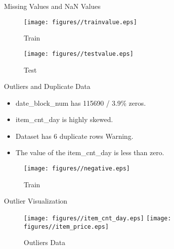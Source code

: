 \documentclass[
 size=14pt,
 paper=smartboard,  %
 mode=present, 		%
 display=slides, 	%
 style=tuliplab,  	%
 pauseslide,
 fleqn,leqno]{powerdot}
\begin{document}
\begin{slide}{Missing Values and NaN Values}

\begin{figure}
  \centering
  \texttt{[image: figures//trainvalue.eps]}
  \caption{Train}\label{fig:demical}
\end{figure}

\begin{figure}
  \centering
  \texttt{[image: figures//testvalue.eps]}
  \caption{Test}\label{fig:timg}
\end{figure}

\end{slide}


\begin{slide}{Outliers and Duplicate Data}

\begin{itemize}
\item
date\_block\_num has 115690 / 3.9\% zeros.
\item
item\_cnt\_day is highly skewed.
\item
Dataset has 6 duplicate rows Warning.
\item
The value of the item\_cnt\_day is less than zero.
\end{itemize}
\begin{figure}
	\centering
	\texttt{[image: figures//negative.eps]}
	\caption{Train}\label{fig:timg}
\end{figure}

\end{slide}


\begin{slide}[toc=,bm=]{Outlier Visualization}
\begin{figure}
	\centering
	\texttt{[image: figures//item\_cnt\_day.eps]}
	\texttt{[image: figures//item\_price.eps]}
	\caption{Outliers Data}\label{fig:timg}
\end{figure}
\end{slide}
\end{document}
